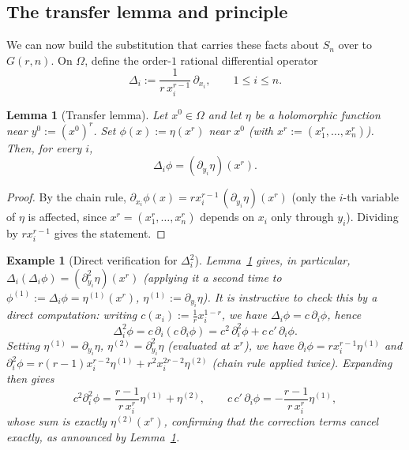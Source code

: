 \documentclass[10pt,a4paper]{amsart}
\newtheorem{lemma}[theorem]{Lemma}
\newtheorem{example}[theorem]{Example}
\begin{document}
\subsection{The transfer lemma and principle}\label{sec:transfert}

We can now build the substitution that carries these facts about $S_n$ over to $G(r,n)$. On $\Omega$, define the order-$1$ rational differential operator
\[
\Delta_i := \frac{1}{r\,x_i^{r-1}}\,\partial_{x_i}, \qquad 1\le i\le n.
\]

\begin{lemma}[Transfer lemma]\label{lem:transfert}
Let $x^0\in\Omega$ and let $\eta$ be a holomorphic function near $y^0:=(x^0)^r$. Set $\phi(x):=\eta(x^r)$ near $x^0$ (with $x^r:=(x_1^r,\dots,x_n^r)$). Then, for every $i$,
\[
\Delta_i \phi = (\partial_{y_i}\eta)(x^r).
\]
\end{lemma}

\begin{proof}
By the chain rule, $\partial_{x_i}\phi(x) = r x_i^{r-1}\,(\partial_{y_i}\eta)(x^r)$ (only the $i$-th variable of $\eta$ is affected, since $x^r=(x_1^r,\dots,x_n^r)$ depends on $x_i$ only through $y_i$). Dividing by $rx_i^{r-1}$ gives the statement.
\end{proof}

\begin{example}[Direct verification for $\Delta_i^2$]\label{ex:delta2}
Lemma~\ref{lem:transfert} gives, in particular, $\Delta_i(\Delta_i\phi)=(\partial_{y_i}^2\eta)(x^r)$ (applying it a second time to $\phi^{(1)}:=\Delta_i\phi=\eta^{(1)}(x^r)$, $\eta^{(1)}:=\partial_{y_i}\eta$). It is instructive to check this by a direct computation: writing $c(x_i):=\frac{1}{r}x_i^{1-r}$, we have $\Delta_i\phi=c\,\partial_i\phi$, hence
\[
\Delta_i^2\phi = c\,\partial_i(c\,\partial_i\phi) = c^2\,\partial_i^2\phi + c\,c'\,\partial_i\phi.
\]
Setting $\eta^{(1)}=\partial_{y_i}\eta$, $\eta^{(2)}=\partial_{y_i}^2\eta$ (evaluated at $x^r$), we have $\partial_i\phi = rx_i^{r-1}\eta^{(1)}$ and $\partial_i^2\phi = r(r-1)x_i^{r-2}\eta^{(1)}+r^2x_i^{2r-2}\eta^{(2)}$ (chain rule applied twice). Expanding then gives
\[
c^2\partial_i^2\phi = \frac{r-1}{r\,x_i^r}\eta^{(1)} + \eta^{(2)}, \qquad c\,c'\,\partial_i\phi = -\frac{r-1}{r\,x_i^r}\eta^{(1)},
\]
whose sum is exactly $\eta^{(2)}(x^r)$, confirming that the correction terms cancel exactly, as announced by Lemma~\ref{lem:transfert}.
\end{example}
\end{document}

